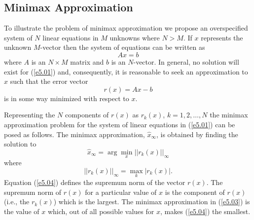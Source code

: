 \subsection{Minimax Approximation}

   To illustrate 
the problem of minimax approximation
we propose an overspecified system of $N$ linear equations
in $M$ unknowns where $N>M$.  If $x$ represents the
unknown $M$-vector then the system of equations can be written
as
%
\begin{equation}
Ax=b
\label{e5.01}
\end{equation}
%
where $A$ is an $N\times M$ matrix and $b$ is an $N$-vector.
In general, no solution will exist for (\ref{e5.01}) and,
consequently, it is reasonable to seek an approximation
to $x$ such that the error vector
%
\begin{equation}
r(x)=Ax-b
\label{e5.02}
\end{equation}
%
is in some way minimized with respect to $x$.

     Representing the $N$ components of $r(x)$ as
$r_k(x)$, $k=1,2,\ldots,N$ the minimax approximation
problem for the system of linear equations in (\ref{e5.01}) can
be posed as follows.  The minimax approximation, $\hat{x}_{\infty}$,
is obtained by finding the solution to
%
\begin{equation}
\hat{x}_{\infty}=\arg\min_x ||r_k(x)||_{\infty}
\label{e5.03}
\end{equation}
%
where
%
\begin{equation}
||r_k(x)||_{\infty}=\max_k |r_k(x)|.
\label{e5.04}
\end{equation}
%
Equation (\ref{e5.04}) defines the supremum norm of the vector 
$r(x)$.  The supremum norm of $r(x)$ for a particular
value of $x$ is the component of $r(x)$ (i.e., the $r_k(x)$)
which is the largest.  The minimax approximation
in (\ref{e5.03}) is the value of $x$ which, out of all possible
values for $x$, makes (\ref{e5.04}) the smallest.

